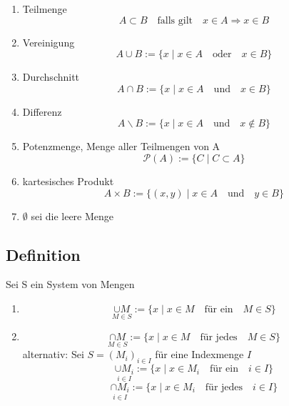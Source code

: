 \begin{enumerate}
 
\item Teilmenge
\begin{displaymath} 
A \subset B \quad \mbox{falls gilt} \quad x \in A \Rightarrow x\in B
\end{displaymath}

\item Vereinigung
\begin{displaymath}
A \cup B := \{ x \mid x \in A  \quad \mbox{oder} \quad x \in B \}
\end{displaymath}

\item Durchschnitt
\begin{displaymath}
A \cap B := \{ x \mid x \in A \quad \mbox{und} \quad x \in B \} 
\end{displaymath}

\item Differenz
\begin{displaymath}
A \backslash B := \{ x \mid x \in A \quad \mbox{und} \quad x \not\in B \}
\end{displaymath}

\item Potenzmenge, Menge aller Teilmengen von A
\begin{displaymath}
\mathcal{P}(A) := \{ C \mid C \subset A\}
\end{displaymath}

\item kartesisches Produkt
\begin{displaymath}
A \times B := \{ (x,y) \mid x \in A \quad \mbox{und} \quad y \in B \}
\end{displaymath}

\item 
\( \emptyset \) sei die leere Menge

\end{enumerate}


\subsection{Definition}
Sei S ein  System von Mengen
\begin{enumerate}
\item 
\begin{displaymath}
\underset{M \in S}{\cup M} := \{ x \mid x \in M \quad \mbox{für ein} \quad M \in S \}
\end{displaymath}

\item 
\[  \underset {M \in S}{\cap M} := \{  x \mid x \in M \quad \mbox{für jedes} \quad M \in S\}  \]
alternativ: Sei \(S=(M_i)_{i \in I} \) für eine Indexmenge \(I\)
\[ \underset{i \in I}{\cup M_i} := \{x \mid x \in M_i \quad \mbox{für ein} \quad i \in I\} \]
\[ \underset{i \in I}{\cap M_i} := \{x\mid x\in M_i \quad \mbox{für jedes} \quad i\in I \} \]

\end{enumerate}


